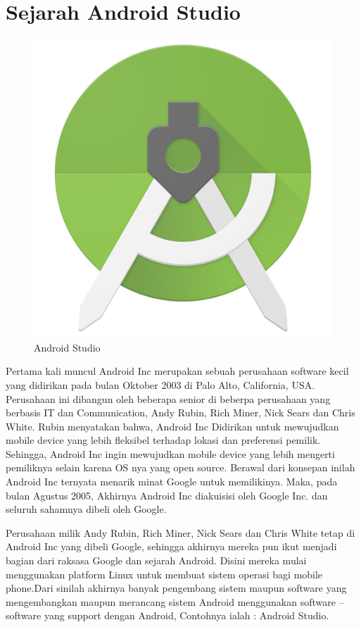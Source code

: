 \section{ Sejarah Android Studio}
\begin{figure}[]
    \centering
    \includegraphics[scale=0.1]{pictures/android-studio.png}
    \caption{Android Studio}
    \label{}
\end{figure}
Pertama kali muncul Android Inc merupakan sebuah perusahaan software kecil yang didirikan pada bulan Oktober 2003 di Palo Alto, California, USA. Perusahaan ini dibangun oleh beberapa senior di beberpa perusahaan yang berbasis IT dan Communication, Andy Rubin, Rich Miner, Nick Sears dan Chris White. Rubin menyatakan bahwa, Android Inc Didirikan untuk mewujudkan mobile device yang lebih fleksibel terhadap lokasi dan preferensi pemilik. Sehingga, Android Inc ingin mewujudkan mobile device yang lebih mengerti pemiliknya selain karena OS nya yang open source. Berawal dari konsepan inilah Android Inc ternyata menarik minat Google untuk memilikinya. Maka, pada bulan Agustus 2005, Akhirnya Android Inc diakuisisi oleh Google Inc. dan seluruh sahamnya dibeli oleh Google.

Perusahaan milik Andy Rubin, Rich Miner, Nick Sears dan Chris White tetap di Android Inc yang dibeli Google, sehingga akhirnya mereka pun ikut  menjadi bagian dari raksasa Google dan sejarah Android. Disini mereka mulai menggunakan platform Linux untuk membuat sistem operasi bagi mobile phone.Dari sinilah akhirnya banyak pengembang sistem maupun software yang mengembangkan maupun merancang sistem Android menggunakan software – software yang support dengan Android, Contohnya ialah : Android Studio.